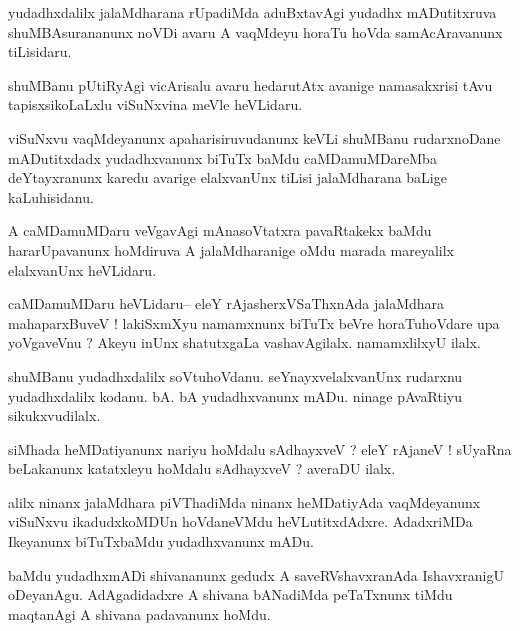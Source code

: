 \documentclass{article}
\begin{document}
\begin{mn}%
yudadhxdalilx jalaMdharana rUpadiMda aduBxtavAgi yudadhx mADutitxruva shuMBAsurananunx noVDi 
avaru A vaqMdeyu horaTu hoVda samAcAravanunx tiLisidaru.
\end{mn}

\begin{mn}%
shuMBanu pUtiRyAgi vicArisalu avaru hedarutAtx avanige namasakxrisi tAvu tapisxsikoLaLxlu 
viSuNxvina meVle heVLidaru.
\end{mn}

\begin{mn}%
viSuNxvu vaqMdeyanunx apaharisiruvudanunx keVLi shuMBanu rudarxnoDane mADutitxdadx 
yudadhxvanunx biTuTx baMdu caMDamuMDareMba deYtayxranunx karedu avarige elalxvanUnx tiLisi 
jalaMdharana baLige kaLuhisidanu.
\end{mn}

\begin{mn}%
A caMDamuMDaru veVgavAgi mAnasoVtatxra pavaRtakekx baMdu hararUpavanunx hoMdiruva A 
jalaMdharanige oMdu marada mareyalilx elalxvanUnx heVLidaru.
\end{mn}

\begin{mn}%
caMDamuMDaru heVLidaru-- eleY rAjasherxVSaThxnAda jalaMdhara mahaparxBuveV ! lakiSxmXyu 
namamxnunx biTuTx beVre horaTuhoVdare upa yoVgaveVnu ? Akeyu inUnx shatutxgaLa 
vashavAgilalx. namamxlilxyU ilalx.
\end{mn}

\begin{mn}%
shuMBanu yudadhxdalilx soVtuhoVdanu. seYnayxvelalxvanUnx rudarxnu yudadhxdalilx kodanu. bA. 
bA yudadhxvanunx mADu. ninage pAvaRtiyu sikukxvudilalx.
\end{mn}

\begin{mn}%
siMhada heMDatiyanunx nariyu hoMdalu sAdhayxveV ? eleY rAjaneV ! sUyaRna beLakanunx 
katatxleyu hoMdalu sAdhayxveV ? averaDU ilalx.
\end{mn}

\begin{mn}%
alilx ninanx jalaMdhara piVThadiMda ninanx heMDatiyAda vaqMdeyanunx viSuNxvu ikadudxkoMDUn 
hoVdaneVMdu heVLutitxdAdxre. AdadxriMDa Ikeyanunx biTuTxbaMdu yudadhxvanunx mADu.
\end{mn}

\begin{mn}%
baMdu yudadhxmADi shivananunx gedudx A saveRVshavxranAda IshavxranigU oDeyanAgu. 
AdAgadidadxre A shivana bANadiMda peTaTxnunx tiMdu maqtanAgi A shivana padavanunx hoMdu.
\end{mn}
\end{document}
